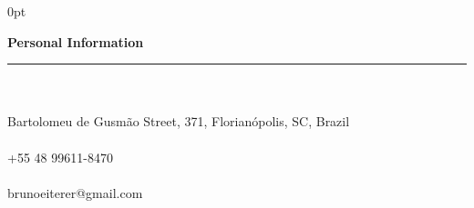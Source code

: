 \documentclass[a4paper]{article}
\begin{document}
\begin{adjustwidth}{\parindent}{0pt}
\begin{minipage}[t]{0.65\textwidth}
\end{minipage} \hspace{0.03\textwidth}
\begin{minipage}[t]{0.25\textwidth}
  \raggedright
  \Large{\textbf{Personal Information}} \normalsize \\ \rule{\textwidth}{0.5pt} \\ \hspace{0pt} \\
   \small{Bartolomeu de Gusmão Street, 371, Florianópolis, SC, Brazil} \\ \hspace{0pt} \\
   \small{+55 48 99611-8470} \\ \hspace{0pt} \\
  \small{brunoeiterer@gmail.com} \\ \hspace{0pt} \\

\end{minipage}
\end{adjustwidth}
\end{document}
